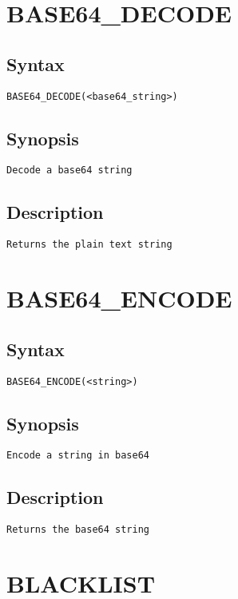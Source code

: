 \section{BASE64\_DECODE}
\subsection{Syntax}
\begin{verbatim}
BASE64_DECODE(<base64_string>)
\end{verbatim}
\subsection{Synopsis}
\begin{verbatim}
Decode a base64 string
\end{verbatim}
\subsection{Description}
\begin{verbatim}
Returns the plain text string

\end{verbatim}


\section{BASE64\_ENCODE}
\subsection{Syntax}
\begin{verbatim}
BASE64_ENCODE(<string>)
\end{verbatim}
\subsection{Synopsis}
\begin{verbatim}
Encode a string in base64
\end{verbatim}
\subsection{Description}
\begin{verbatim}
Returns the base64 string

\end{verbatim}


\section{BLACKLIST}
